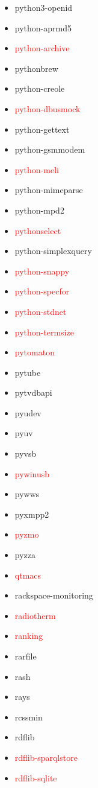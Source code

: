 \documentclass{l4proj}
\begin{document}
\begin{appendices}
{\begin{itemize}
\item python3-openid
\item python-aprmd5
\item\textcolor{red}{python-archive}
\item pythonbrew
\item python-creole
\item\textcolor{red}{python-dbusmock}
\item python-gettext
\item python-gsmmodem
\item\textcolor{red}{python-meli}
\item python-mimeparse
\item python-mpd2
\item\textcolor{red}{pythonselect}
\item python-simplexquery
\item\textcolor{red}{python-snappy}
\item\textcolor{red}{python-specfor}
\end{itemize}
}%
\noindent\parbox[t]{0.32\textwidth}{\raggedright%
\begin{itemize}
\item\textcolor{red}{python-stdnet}
\item\textcolor{red}{python-termsize}
\item\textcolor{red}{pytomaton}
\item pytube
\item pytvdbapi
\item pyudev
\item pyuv
\item pyvsb
\item\textcolor{red}{pywinusb}
\item pywws
\item pyxmpp2
\item\textcolor{red}{pyzmo}
\item pyzza
\item\textcolor{red}{qtmacs}
\item rackspace-monitoring
\item\textcolor{red}{radiotherm}
\item\textcolor{red}{ranking}
\item rarfile
\item rash
\item rays
\item rcssmin
\item rdflib
\item\textcolor{red}{rdflib-sparqlstore}
\item\textcolor{red}{rdflib-sqlite}

\end{itemize}}
\end{appendices}
\end{document}
